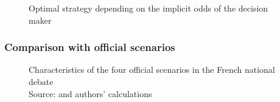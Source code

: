 \begin{figure}
	\centering
	\caption{Optimal strategy depending on the implicit odds of the decision maker}
	\label{fig_app:odds}
\end{figure}


\clearpage
\subsubsection{Comparison with official scenarios}

\begin{figure}
	\centering
	\caption{Characteristics of the four official scenarios in the French national debate \\Source: \citet{DNTE_gt2} and authors' calculations}
	\label{fig:DNTE_scenarios}
\end{figure}

